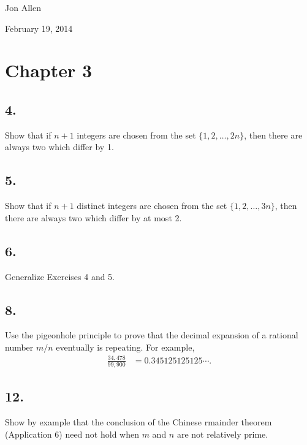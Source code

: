 \documentclass{article}
\begin{document}
Jon Allen

February 19, 2014

\section*{Chapter 3}
\subsection*{4.}
Show that if $n+1$ integers are chosen from the set $\{1,2,\dots,2n\}$, then there are always two which differ by 1.
\subsection*{5.}
Show that if $n+1$ distinct integers are chosen from the set $\{1,2,\dots,3n\}$, then there are always two which differ by at most 2.
\subsection*{6.}
Generalize Exercises 4 and 5.
\subsection*{8.}
Use the pigeonhole principle to prove that the decimal expansion of a rational number $m/n$ eventually is repeating. For example,
\begin{align*}
  \frac{34,478}{99,900}&=0.345125125125\cdots.
\end{align*}
\subsection*{12.}
Show by example that the conclusion of the Chinese rmainder theorem (Application 6) need not hold when $m$ and $n$ are not relatively prime.
\end{document}
